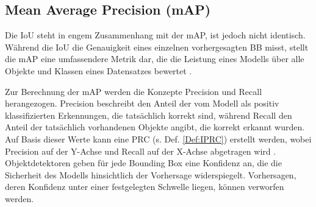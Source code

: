 





\subsection{Mean Average Precision (mAP)}

Die \acrlong{IoU} steht in engem Zusammenhang mit der \acrfull{mAP}, ist jedoch nicht identisch. Während die \acrshort{IoU} die Genauigkeit eines einzelnen vorhergesagten \acrshort{BB} misst, stellt die \acrshort{mAP} eine umfassendere Metrik dar, die die Leistung eines Modells über alle Objekte und Klassen eines Datensatzes bewertet \cite{ultralyics_iou}.

Zur Berechnung der \acrshort{mAP} werden die Konzepte Precision und Recall herangezogen. Precision beschreibt den Anteil der vom Modell als positiv klassifizierten Erkennungen, die tatsächlich korrekt sind, während Recall den Anteil der tatsächlich vorhandenen Objekte angibt, die korrekt erkannt wurden. Auf Basis dieser Werte kann eine \acrfull{PRC} (s. Def. \ref{Def:IPRC}) erstellt werden, wobei Precision auf der Y-Achse und Recall auf der X-Achse abgetragen wird \cite{Goodfellow-et-al-2016}. Objektdetektoren geben für jede Bounding Box eine Konfidenz an, die die Sicherheit des Modells hinsichtlich der Vorhersage widerspiegelt. Vorhersagen, deren Konfidenz unter einer festgelegten Schwelle liegen, können verworfen werden. 

